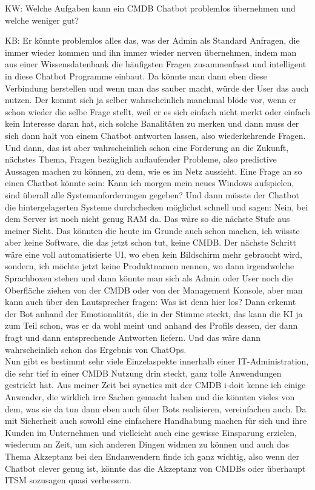 \begin{list}{X:}{\setlength{\labelsep}{5mm}}
\item[KW:] Welche Aufgaben kann ein CMDB Chatbot problemlos übernehmen und welche weniger gut?
\item[KB:] Er könnte problemlos alles das, was der Admin als Standard Anfragen, die immer wieder kommen und ihn immer wieder nerven übernehmen, indem man aus einer Wissensdatenbank die häufigsten Fragen zusammenfasst und intelligent in diese Chatbot Programme einbaut.  Da könnte man dann eben diese Verbindung herstellen und wenn man das sauber macht, würde der User das auch nutzen. Der kommt sich ja selber wahrscheinlich manchmal blöde vor, wenn er schon wieder die selbe Frage stellt, weil er es sich einfach nicht merkt oder einfach kein Interesse daran hat, sich solche Banalitäten zu merken und dann muss der sich dann halt von einem Chatbot antworten lassen, also wiederkehrende Fragen.\\ Und dann, das ist aber wahrscheinlich schon eine Forderung an die Zukunft, nächstes Thema, Fragen bezüglich auflaufender Probleme, also predictive Aussagen machen zu können, zu dem, wie es im Netz aussieht. Eine Frage an so einen Chatbot könnte sein: Kann ich morgen mein neues Windows aufspielen, sind überall alle Systemanforderungen gegeben? Und dann müsste der Chatbot die hintergelagerten Systeme durchchecken möglichst schnell und sagen: Nein, bei dem Server ist noch nicht genug RAM da. Das wäre so die nächste Stufe aus meiner Sicht. Das könnten die heute im Grunde auch schon machen, ich wüsste aber keine Software, die das jetzt schon tut, keine CMDB. Der nächste Schritt wäre eine voll automatisierte UI, wo eben kein Bildschirm mehr gebraucht wird, sondern, ich möchte jetzt keine Produktnamen nennen, wo dann irgendwelche Sprachboxen stehen und dann könnte man sich als Admin oder User noch die Oberfläche ziehen von der CMDB oder von der Management Konsole, aber man kann auch über den Lautsprecher fragen: Was ist denn hier los? Dann erkennt der Bot anhand der Emotionalität, die in der Stimme steckt, das kann die KI ja zum Teil schon, was er da wohl meint und anhand des Profils dessen, der dann fragt und dann entsprechende Antworten liefern. Und das wäre dann wahrscheinlich schon das Ergebnis von ChatOps.\\ Nun gibt es bestimmt sehr viele Einzelaspekte innerhalb einer IT-Administration, die sehr tief in einer CMDB Nutzung drin steckt, ganz tolle Anwendungen gestrickt hat. Aus meiner Zeit bei synetics mit der CMDB i-doit kenne ich einige Anwender, die wirklich irre Sachen gemacht haben und die könnten vieles von dem, was sie da tun dann eben auch über Bots realisieren, vereinfachen auch. Da mit Sicherheit auch sowohl eine einfachere Handhabung machen für sich und ihre Kunden im Unternehmen und vielleicht auch eine gewisse Einsparung erzielen, wiederum an Zeit, um sich anderen Dingen widmen zu können und auch das Thema Akzeptanz bei den Endanwendern finde ich ganz wichtig, also wenn der Chatbot clever genug ist, könnte das die Akzeptanz von CMDBs oder überhaupt ITSM sozusagen quasi verbessern. 

\end{list}
